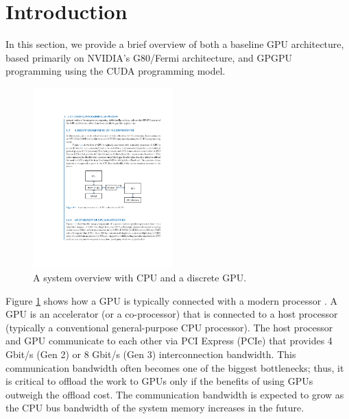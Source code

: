\documentclass[twocolumn]{article}
\begin{document}
\section{Introduction}
In this section, we provide a brief overview of both a baseline GPU architecture, based primarily on NVIDIA’s G80/Fermi architecture, and GPGPU programming using the CUDA programming model.
\begin{figure}[htb]
        \centering
        \includegraphics[width=0.48\textwidth]{system-overview.pdf}
        \caption{A system overview with CPU and a discrete GPU.}
        \label{fig:system_overview}
\end{figure}

Figure \ref{fig:system_overview} shows how a GPU is typically connected with a modern processor \cite{Kim:2012}. A GPU is an accelerator (or a co-processor) that is connected to a host processor (typically a conventional general-purpose CPU processor). The host processor and GPU communicate to each other via PCI Express (PCIe) that provides 4 Gbit/s (Gen 2) or 8 Gbit/s (Gen 3) interconnection bandwidth. This communication bandwidth often becomes one of the biggest bottlenecks; thus, it is critical to offload the work to GPUs only if the benefits of using GPUs outweigh the offload cost. The communication bandwidth is expected to grow as the CPU bus bandwidth of the system memory increases in the future.
\end{document}
